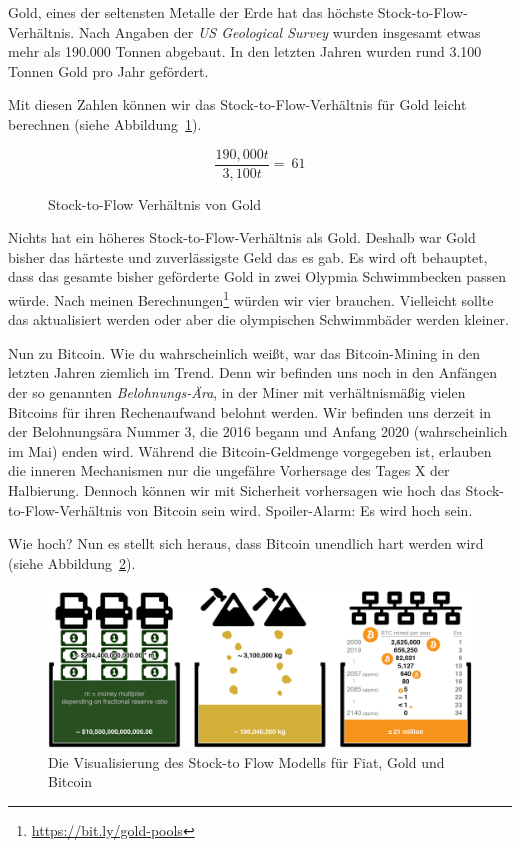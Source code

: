 Gold, eines der seltensten Metalle der Erde hat das höchste
Stock-to-Flow-Verhältnis. Nach Angaben der \textit{US Geological Survey} wurden
insgesamt etwas mehr als 190.000 Tonnen abgebaut. In den letzten Jahren wurden
rund 3.100 Tonnen Gold pro Jahr gefördert.~\cite{mineral-commodity-summaries}

Mit diesen Zahlen können wir das Stock-to-Flow-Verhältnis für Gold leicht
berechnen (siehe Abbildung~\ref{fig:stock-to-flow-gold}).

\begin{figure}
  \centering
  \begin{equation}
  \frac{190,000 t}{3,100 t} = ~ 61
  \end{equation}
  \caption{Stock-to-Flow Verhältnis von Gold}
  \label{fig:stock-to-flow-gold}
\end{figure}

Nichts hat ein höheres Stock-to-Flow-Verhältnis als Gold. Deshalb war Gold
bisher das härteste und zuverlässigste Geld das es gab. Es wird oft behauptet,
dass das gesamte bisher geförderte Gold in zwei Olypmia Schwimmbecken passen
würde. Nach meinen Berechnungen\footnote{\url{https://bit.ly/gold-pools}} würden
wir vier brauchen. Vielleicht sollte das aktualisiert werden oder aber die
olympischen Schwimmbäder werden kleiner.

Nun zu Bitcoin. Wie du wahrscheinlich weißt, war das Bitcoin-Mining in den
letzten Jahren ziemlich im Trend. Denn wir befinden uns noch in den Anfängen der
so genannten \textit{Belohnungs-Ära}, in der Miner mit verhältnismäßig vielen
Bitcoins für ihren Rechenaufwand belohnt werden. Wir befinden uns derzeit in der
Belohnungsära Nummer 3, die 2016 begann und Anfang 2020 (wahrscheinlich im Mai)
enden wird. Während die Bitcoin-Geldmenge vorgegeben ist, erlauben die inneren
Mechanismen nur die ungefähre Vorhersage des Tages X der Halbierung. Dennoch
können wir mit Sicherheit vorhersagen wie hoch das Stock-to-Flow-Verhältnis von
Bitcoin sein wird. Spoiler-Alarm: Es wird hoch sein.

Wie hoch? Nun es stellt sich heraus, dass Bitcoin unendlich hart werden wird
(siehe Abbildung~\ref{fig:stock-to-flow-white-cropped}).

\begin{figure}
  \includegraphics{assets/images/stock-to-flow-white-cropped.png}
  \caption{Die Visualisierung des Stock-to Flow Modells für Fiat, Gold und Bitcoin}
  \label{fig:stock-to-flow-white-cropped}
\end{figure}

